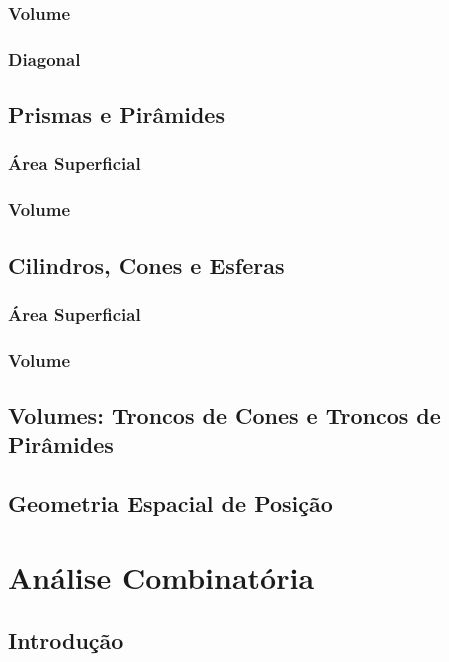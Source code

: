 \documentclass[12pt,a4paper]{book}
\begin{document}
			\subsection{Volume}
			\subsection{Diagonal}
		
		\section{Prismas e Pirâmides}
			\subsection{Área Superficial}
			\subsection{Volume}
		
		\section{Cilindros, Cones e Esferas}
			\subsection{Área Superficial}
			\subsection{Volume}
			
		\section{Volumes: Troncos de Cones e Troncos de Pirâmides}
		
		\section{Geometria Espacial de Posição}		

	\chapter{Análise Combinatória}
	
		
		\section{Introdução}
		
\end{document}
